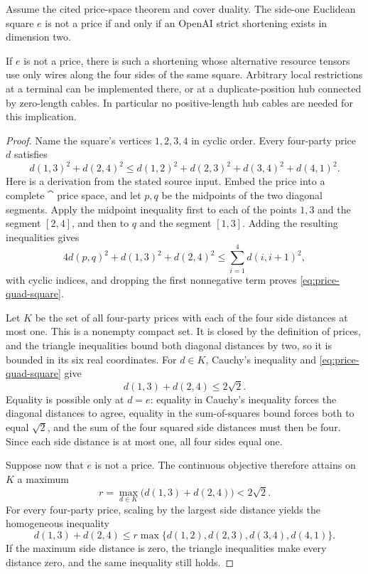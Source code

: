 \begin{theorem}\label{thm:square-shortening-equivalence}
Assume the cited price-space theorem and cover duality. The side-one Euclidean square $e$ is not a price if and only if an OpenAI strict shortening exists in dimension two.

If $e$ is not a price, there is such a shortening whose alternative resource tensors use only wires along the four sides of the same square. Arbitrary local restrictions at a terminal can be implemented there, or at a duplicate-position hub connected by zero-length cables. In particular no positive-length hub cables are needed for this implication.
\end{theorem}
\begin{proof}
Name the square's vertices $1,2,3,4$ in cyclic order. Every four-party price $d$ satisfies
\begin{equation}\label{eq:price-quad-square}
 d(1,3)^2+d(2,4)^2\leq
 d(1,2)^2+d(2,3)^2+d(3,4)^2+d(4,1)^2.
\end{equation}
Here is a derivation from the stated source input. Embed the price into a complete $\cat$ price space, and let $p,q$ be the midpoints of the two diagonal segments. Apply the midpoint inequality first to each of the points $1,3$ and the segment $[2,4]$, and then to $q$ and the segment $[1,3]$. Adding the resulting inequalities gives
\[
 4d(p,q)^2+d(1,3)^2+d(2,4)^2
 \leq\sum_{i=1}^4d(i,i+1)^2,
\]
with cyclic indices, and dropping the first nonnegative term proves \eqref{eq:price-quad-square}.

Let $K$ be the set of all four-party prices with each of the four side distances at most one. This is a nonempty compact set. It is closed by the definition of prices, and the triangle inequalities bound both diagonal distances by two, so it is bounded in its six real coordinates. For $d\in K$, Cauchy's inequality and \eqref{eq:price-quad-square} give
\[
 d(1,3)+d(2,4)\leq2\sqrt2.
\]
Equality is possible only at $d=e$: equality in Cauchy's inequality forces the diagonal distances to agree, equality in the sum-of-squares bound forces both to equal $\sqrt2$, and the sum of the four squared side distances must then be four. Since each side distance is at most one, all four sides equal one.

Suppose now that $e$ is not a price. The continuous objective therefore attains on $K$ a maximum
\[
 r=\max_{d\in K}\bigl(d(1,3)+d(2,4)\bigr)<2\sqrt2.
\]
For every four-party price, scaling by the largest side distance yields the homogeneous inequality
\begin{equation}\label{eq:strict-diagonal-side-gap}
 d(1,3)+d(2,4)\leq
 r\max\{d(1,2),d(2,3),d(3,4),d(4,1)\}.
\end{equation}
If the maximum side distance is zero, the triangle inequalities make every distance zero, and the same inequality still holds.


\end{proof}
